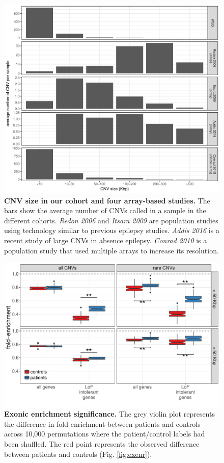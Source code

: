 \begin{figure}[htp]
  \centering
  \includegraphics[width=.9\linewidth]{figures/wgs-array-sizeComp.pdf}
  \caption[CNV size in our cohort and array-based studies.]{{\bf CNV size in our cohort and four array-based studies.} {\small The bars show the average number of CNVs called in a sample in the different cohorts. {\it Redon 2006}\cite{Redon2006} and {\it Itsara 2009}\cite{Itsara2009} are population studies using technology similar to previous epilepsy studies. {\it Addis 2016}\cite{Addis2016} is a recent study of large CNVs in absence epilepsy. {\it Conrad 2010}\cite{Conrad2010} is a population study that used multiple arrays to increase its resolution. }}
  \label{fig:arraysize}
\end{figure}

\begin{figure}[htp]
  \centering
  \includegraphics[width=.9\linewidth, page=2]{figures/epilepsy-enrichmentPatterns.pdf}
  \caption[Exonic enrichment significance.]{{\bf Exonic enrichment significance.} {\small The grey violin plot represents the difference in fold-enrichment between patients and controls across 10,000 permutations where the patient/control labels had been shuffled. The red point represents the observed difference between patients and controls (Fig. \ref{fig:exenr}).}}
  \label{fig:exenrsig}
\end{figure}


